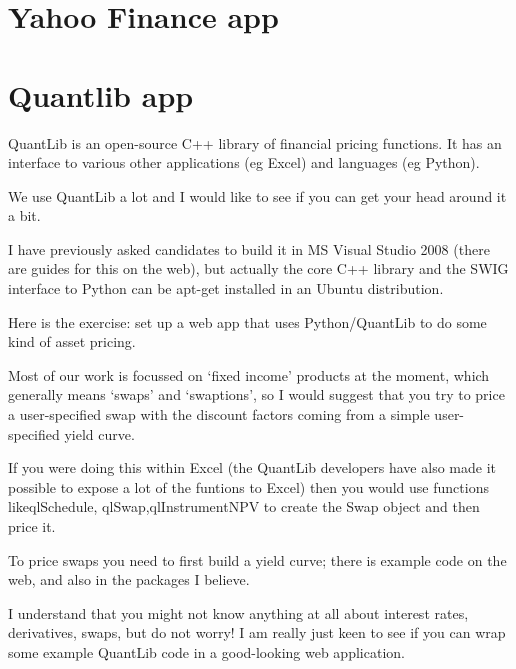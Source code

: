 \documentclass{article}
\begin{document}
\section{Yahoo Finance app}
\section{Quantlib app}
\begin{itshape}
QuantLib is an open-source C++ library of financial pricing functions. It has an interface to various other applications (eg Excel) and languages (eg Python).

We use QuantLib a lot and I would like to see if you can get your head around it a bit.

I have previously asked candidates to build it in MS Visual Studio 2008 (there are guides for this on the web), but actually the core C++ library and the SWIG interface to Python can be apt-get installed in an Ubuntu distribution.

Here is the exercise: set up a web app that uses Python/QuantLib to do some kind of asset pricing.

Most of our work is focussed on ‘fixed income’ products at the moment, which generally means ‘swaps’ and ‘swaptions’, so I would suggest that you try to price a user-specified swap with the discount factors coming from a simple user-specified yield curve.

If you were doing this within Excel (the QuantLib developers have also made it possible to expose a lot of the funtions to Excel) then you would use functions likeqlSchedule, qlSwap,qlInstrumentNPV to create the Swap object and then price it.

To price swaps you need to first build a yield curve; there is example code on the web, and also in the packages I believe.

I understand that you might not know anything at all about interest rates, derivatives, swaps, but do not worry! I am really just keen to see if you can wrap some example QuantLib code in a good-looking web application.
\end{itshape}
\end{document}
